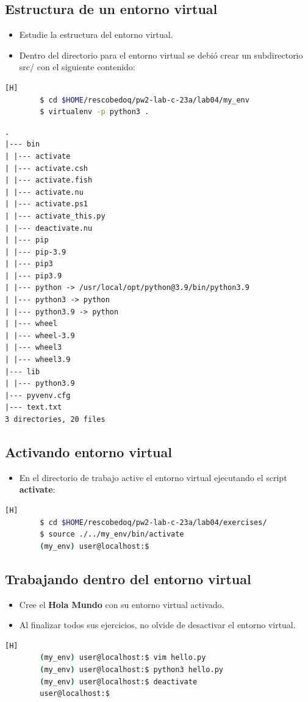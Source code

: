 \documentclass{article}
\begin{document}
	\subsection{Estructura de un entorno virtual}
	\begin{itemize}
		\item Estudie la estructura del entorno virtual.
		\item Dentro del directorio para el entorno virtual se debió crear un subdirectorio src/ con el siguiente contenido:
	\end{itemize}
	\begin{lstlisting}[language=bash,caption={Creando entorno virtual}][H]
		$ cd $HOME/rescobedoq/pw2-lab-c-23a/lab04/my_env
		$ virtualenv -p python3 .
	\end{lstlisting}
	\begin{lstlisting}[style=ascii-tree]
.
|--- bin
| |--- activate
| |--- activate.csh
| |--- activate.fish
| |--- activate.nu
| |--- activate.ps1
| |--- activate_this.py
| |--- deactivate.nu
| |--- pip
| |--- pip-3.9
| |--- pip3
| |--- pip3.9
| |--- python -> /usr/local/opt/python@3.9/bin/python3.9
| |--- python3 -> python
| |--- python3.9 -> python
| |--- wheel
| |--- wheel-3.9
| |--- wheel3
| |--- wheel3.9
|--- lib
| |--- python3.9
|--- pyvenv.cfg
|--- text.txt
3 directories, 20 files
	\end{lstlisting} 
	
	\subsection{Activando entorno virtual}
	\begin{itemize}
		\item En el directorio de trabajo active el entorno virtual ejecutando el script \textbf{activate}:
	\end{itemize}
	\begin{lstlisting}[language=bash,caption={Activando entorno virtual}][H]
		$ cd $HOME/rescobedoq/pw2-lab-c-23a/lab04/exercises/
		$ source ./../my_env/bin/activate
		(my_env) user@localhost:$
	\end{lstlisting}
	
	\subsection{Trabajando dentro del entorno virtual}
	\begin{itemize}
		\item Cree el \textbf{Hola Mundo} con su entorno virtual activado.
		\item Al finalizar todos sus ejercicios, no olvide de desactivar el entorno virtual.
	\end{itemize}
	\begin{lstlisting}[language=bash,caption={Trabajando en el entorno virtual}][H]
		(my_env) user@localhost:$ vim hello.py
		(my_env) user@localhost:$ python3 hello.py
		(my_env) user@localhost:$ deactivate
		user@localhost:$
	\end{lstlisting}
	
\end{document}
